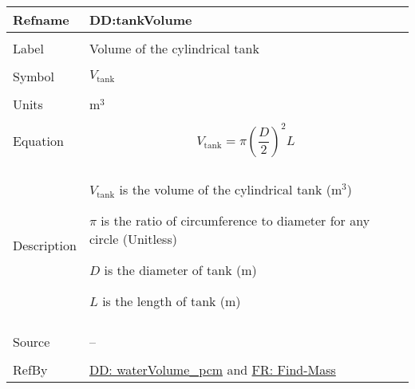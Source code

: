 \documentclass[12pt]{article}
\begin{document}
\vspace{\baselineskip}
\noindent
\begin{minipage}{\textwidth}
\begin{tabular}{>{\raggedright}p{}>{\raggedright\arraybackslash}p{}}
\toprule \textbf{Refname} & \textbf{DD:tankVolume}
\label{DD:tankVolume}
\\ \midrule \\
Label & Volume of the cylindrical tank
        
\\ \midrule \\
Symbol & ${V_{\text{tank}}}$
         
\\ \midrule \\
Units & ${\text{m}^{3}}$
        
\\ \midrule \\
Equation & \begin{displaymath}
           {V_{\text{tank}}}=π \left(\frac{D}{2}\right)^{2} L
           \end{displaymath}
\\ \midrule \\
Description & \begin{symbDescription}
              \item{${V_{\text{tank}}}$ is the volume of the cylindrical tank (${\text{m}^{3}}$)}
              \item{$π$ is the ratio of circumference to diameter for any circle (Unitless)}
              \item{$D$ is the diameter of tank (${\text{m}}$)}
              \item{$L$ is the length of tank (${\text{m}}$)}
              \end{symbDescription}
\\ \midrule \\
Source & --
         
\\ \midrule \\
RefBy & \hyperref[DD:waterVolume.pcm]{DD: waterVolume\_pcm} and \hyperref[findMass]{FR: Find-Mass}
        
\\ \bottomrule
\end{tabular}
\end{minipage}
\end{document}
